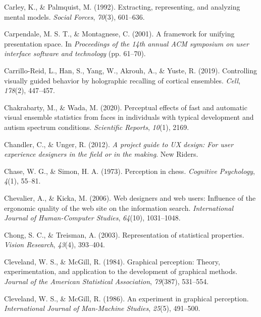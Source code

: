 \documentclass[print]{nuthesis}
\newlength{\cslhangindent}
\newenvironment{CSLReferences}[2]%
{\setlength{\parindent}{0pt}%
\everypar{\setlength{\hangindent}{\cslhangindent}}\ignorespaces}%
{\par}
\begin{document}
\begin{CSLReferences}{1}{0}
\leavevmode{}%
Carley, K., \& Palmquist, M. (1992). Extracting, representing, and analyzing mental models. \emph{Social Forces}, \emph{70}(3), 601--636.

\leavevmode{}%
Carpendale, M. S. T., \& Montagnese, C. (2001). A framework for unifying presentation space. In \emph{Proceedings of the 14th annual ACM symposium on user interface software and technology} (pp. 61--70).

\leavevmode{}%
Carrillo-Reid, L., Han, S., Yang, W., Akrouh, A., \& Yuste, R. (2019). Controlling visually guided behavior by holographic recalling of cortical ensembles. \emph{Cell}, \emph{178}(2), 447--457.

\leavevmode{}%
Chakrabarty, M., \& Wada, M. (2020). Perceptual effects of fast and automatic visual ensemble statistics from faces in individuals with typical development and autism spectrum conditions. \emph{Scientific Reports}, \emph{10}(1), 2169.

\leavevmode{}%
Chandler, C., \& Unger, R. (2012). \emph{A project guide to UX design: For user experience designers in the field or in the making}. New Riders.

\leavevmode{}%
Chase, W. G., \& Simon, H. A. (1973). Perception in chess. \emph{Cognitive Psychology}, \emph{4}(1), 55--81.

\leavevmode{}%
Chevalier, A., \& Kicka, M. (2006). Web designers and web users: Influence of the ergonomic quality of the web site on the information search. \emph{International Journal of Human-Computer Studies}, \emph{64}(10), 1031--1048.

\leavevmode{}%
Chong, S. C., \& Treisman, A. (2003). Representation of statistical properties. \emph{Vision Research}, \emph{43}(4), 393--404.

\leavevmode{}%
Cleveland, W. S., \& McGill, R. (1984). Graphical perception: Theory, experimentation, and application to the development of graphical methods. \emph{Journal of the American Statistical Association}, \emph{79}(387), 531--554.

\leavevmode{}%
Cleveland, W. S., \& McGill, R. (1986). An experiment in graphical perception. \emph{International Journal of Man-Machine Studies}, \emph{25}(5), 491--500.


\end{CSLReferences}
\end{document}
